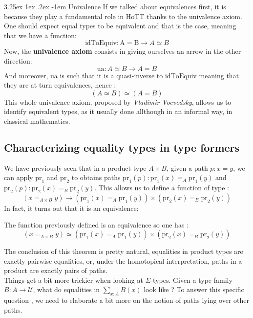 \documentclass{report}
\makeatletter
\renewcommand\paragraph{\@startsection{paragraph}{5}{\z@}%
  {3.25ex \@plus1ex \@minus.2ex}%
  {-1em}%
  {\normalfont\normalsize\bfseries}}
\makeatother
\begin{document}
\paragraph{Univalence}
If we talked about equivalences first, it is because they play a fundamental role in HoTT thanks to the univalence axiom. One should expect equal types to be equivalent and that is the case, meaning that we have a function: 
$$\mathrm{idToEquiv : A = B \rightarrow} A \simeq B$$
Now, the \textbf{univalence axiom} consists in giving ourselves an arrow in the other direction:
$$\mathrm{ua} : A \simeq B \rightarrow A = B$$
And moreover, $\mathrm{ua}$ is such that it is a quasi-inverse to $\mathrm{idToEquiv}$ meaning that they are at turn equivalences, hence : 
$$(A \simeq B) \simeq  (A = B)$$
This whole univalence axiom, proposed by \textit{Vladimir Voevodsky}, allows us to identify equivalent types, as it usually done  allthough in an informal way, in classical mathematics. 
\subsection{Characterizing equality types in type formers}
We have previously seen that in a product type $A \times B$, given a path $p : x=y$, we can apply $\mathrm{pr}_1$ and $\mathrm{pr}_2$ to obtains paths $\mathrm{pr}_1(p) : \mathrm{pr}_1(x)=_A \mathrm{pr}_1(y)$ and $\mathrm{pr}_2(p) : \mathrm{pr}_2(x)=_B \mathrm{pr}_2(y)$. This allows us to define a function of type : 
$$ (x =_{A\times B} y) \rightarrow (\mathrm{pr}_1(x)=_A \mathrm{pr}_1(y)) \times (\mathrm{pr}_2(x)=_B \mathrm{pr}_2(y))$$
In fact, it turns out that it is an equivalence:
\begin{theorem}
The function previously defined is an equivalence so one has :
$$(x=_{A \times B} y) \simeq (\mathrm{pr}_1(x)=_A \mathrm{pr}_1(y)) \times (\mathrm{pr}_2(x)=_B \mathrm{pr}_2(y))$$
\end{theorem}
The conclusion of this theorem is pretty natural, equalities in product types are exactly pairwise equalities, or, under the homotopical interpretation, paths in a product are exactly pairs of paths.\\
Things get a bit more trickier when looking at $\Sigma$-types. Given a type family $B : A \rightarrow \mathcal{U}$, what do equalities in $\sum_{x : A} B(x)$ look like ? To answer this specific question , we need to elaborate a bit more on the notion of paths lying over other paths.
\end{document}
